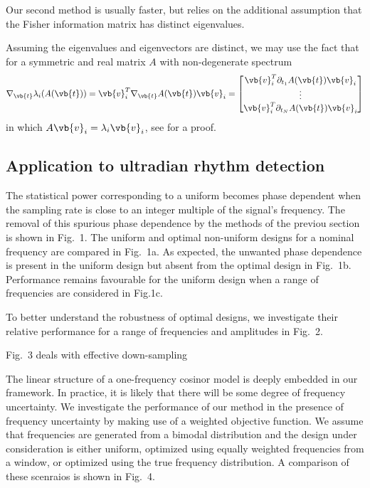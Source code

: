 Our second method is usually faster, but relies on the additional assumption that the Fisher information matrix has distinct eigenvalues. 

Assuming the eigenvalues and eigenvectors are distinct, we may use the fact that for a symmetric and real matrix $A$ with non-degenerate spectrum
\begin{align}
    \nabla_{\vb{t}} \lambda_{i} (A(\vb{t})) = \vb{v}_{i}^T \nabla_{\vb{t}} A(\vb{t}) \vb{v}_i = \begin{bmatrix}
         \vb{v}_{i}^T \partial_{t_{1}}  A(\vb{t}) \vb{v}_i\\
         \vdots \\
         \vb{v}_{i}^T \partial_{t_{N}}  A(\vb{t}) \vb{v}_i
    \end{bmatrix}\label{eqn:grad}
\end{align}
in which $A\vb{v}_{i} = \lambda_i \vb{v}_{i}$, see \cite{horn2012matrix} for a proof.
\subsection{Application to ultradian rhythm detection}

The statistical power corresponding to a uniform becomes phase dependent when the sampling rate is close to an integer multiple of the signal's frequency. The removal of this spurious phase dependence by the methods of the previou section is shown in Fig.~1. The uniform and optimal non-uniform designs for a nominal frequency are compared in Fig.~1a. As expected, the unwanted phase dependence is present in the uniform design but absent from the optimal design in Fig.~1b. Performance remains favourable for the uniform design when a range of frequencies are considered in Fig.1c. 

To better understand the robustness of optimal designs, we investigate their relative performance for a range of frequencies and amplitudes in Fig.~2. 

Fig.~3 deals with effective down-sampling

The linear structure of a one-frequency cosinor model is deeply embedded in our framework. In practice, it is likely that there will be some degree of frequency uncertainty. We investigate the performance of our method in the presence of frequency uncertainty by making use of a weighted objective function. We assume that frequencies are generated from a bimodal distribution and the design under consideration is either uniform, optimized using equally weighted frequencies from a window, or optimized using the true frequency distribution. A comparison of these scenraios is shown in Fig.~4.

